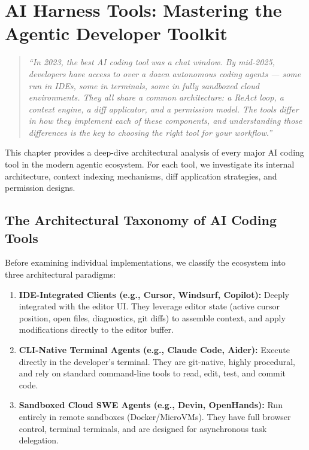 \chapter{AI Harness Tools: Mastering the Agentic Developer Toolkit}

\begin{quote}
\textit{``In 2023, the best AI coding tool was a chat window. By mid-2025, developers have access to over a dozen autonomous coding agents --- some run in IDEs, some in terminals, some in fully sandboxed cloud environments. They all share a common architecture: a ReAct loop, a context engine, a diff applicator, and a permission model. The tools differ in how they implement each of these components, and understanding those differences is the key to choosing the right tool for your workflow.''}
\end{quote}

This chapter provides a deep-dive architectural analysis of every major AI coding tool in the modern agentic ecosystem. For each tool, we investigate its internal architecture, context indexing mechanisms, diff application strategies, and permission designs.

\section{The Architectural Taxonomy of AI Coding Tools}

Before examining individual implementations, we classify the ecosystem into three architectural paradigms:

\begin{enumerate}
    \item \textbf{IDE-Integrated Clients (e.g., Cursor, Windsurf, Copilot):} Deeply integrated with the editor UI. They leverage editor state (active cursor position, open files, diagnostics, git diffs) to assemble context, and apply modifications directly to the editor buffer.
    \item \textbf{CLI-Native Terminal Agents (e.g., Claude Code, Aider):} Execute directly in the developer's terminal. They are git-native, highly procedural, and rely on standard command-line tools to read, edit, test, and commit code.
    \item \textbf{Sandboxed Cloud SWE Agents (e.g., Devin, OpenHands):} Run entirely in remote sandboxes (Docker/MicroVMs). They have full browser control, terminal terminals, and are designed for asynchronous task delegation.
\end{enumerate}

